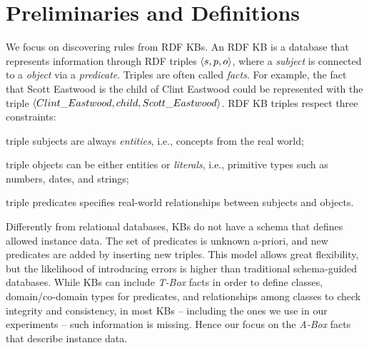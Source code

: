 \section{Preliminaries and Definitions} \label{sec:krd_prel}
We focus on discovering rules from RDF KBs. An RDF KB is
a database that represents information through RDF triples $\langle s,p,o\rangle$, where a \emph{subject} is connected to a \emph{object} via a \emph{predicate}. Triples are often called \emph{facts}. For example, the fact that Scott Eastwood is the child of Clint Eastwood could be represented with the triple $\langle Clint\_Eastwood,child,Scott\_Eastwood\rangle$. 
RDF KB triples respect three constraints:
\begin{inparaenum}[(i)]
\item triple subjects are always \emph{entities}, i.e., concepts from the real world;
\item triple objects can be either entities or \emph{literals}, i.e.,  primitive types such as numbers, dates, and strings;
\item triple predicates specifies real-world relationships between subjects and objects.
\end{inparaenum}

Differently from relational databases, KBs do not have a schema that defines allowed instance data. 
The set of predicates is unknown a-priori, and new predicates are added by inserting new triples. %
This model allows great flexibility, but the likelihood of introducing errors is higher than traditional schema-guided databases.
While KBs can include \emph{T-Box} facts in order to define classes, domain/co-domain types for predicates, and relationships among classes
to check integrity and consistency, in most KBs -- including the ones we use in our experiments -- such information is missing. %
Hence our focus on the \emph{A-Box} facts that describe instance data. 

